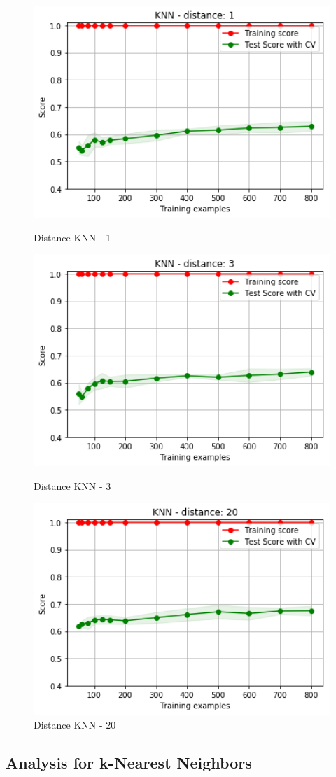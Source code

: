 \documentclass[h]{article}
\begin{document}
\begin{figure}[H]
      \includegraphics[width=1\textwidth,keepaspectratio]{2_knn_1_2.png} 
      \caption*{Distance KNN - 1} 
   \endminipage\hfill
      \includegraphics[width=1\textwidth,keepaspectratio]{2_knn_3_2.png} 
      \caption*{Distance KNN - 3} 
   \endminipage\hfill
      \includegraphics[width=1\textwidth,keepaspectratio]{2_knn_20_2.png} 
      \caption*{Distance KNN - 20} 
   \endminipage\hfill
\end{figure}

\subsection*{Analysis for k-Nearest Neighbors} 
\end{document}
